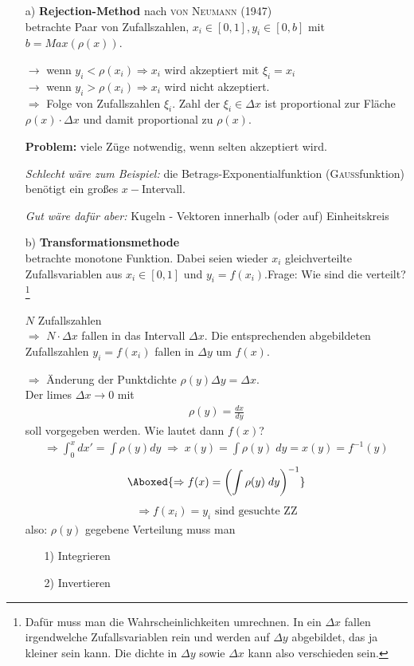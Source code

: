 \documentclass[12pt]{article}
\begin{document}
 \begin{itemize}
 \item[a)] \textbf{Rejection-Method} nach \textsc{von Neumann} (1947) \\
 betrachte Paar von Zufallszahlen, $x_i \in [0,1], y_i \in [0,b]$ mit $b=Max(\rho(x))$.
 
$\to$ wenn $y_i < \rho(x_i) \Rightarrow x_i$ wird akzeptiert mit $\xi_i=x_i$\\
 $\to$ wenn $y_i > \rho(x_i) \Rightarrow x_i$ wird nicht akzeptiert. \\
 
 $\Rightarrow$ Folge von Zufallszahlen $\xi_i$. Zahl der $\xi_i \in \Delta x$ ist proportional zur Fläche $\rho(x) \cdot \Delta x$ und damit proportional zu $\rho(x)$.
 
 \textbf{Problem:} viele Züge notwendig, wenn selten akzeptiert wird. 
 
 \textit{Schlecht wäre zum Beispiel:} die Betrags-Exponentialfunktion (\textsc{Gauß}funktion) benötigt ein großes $x-$Intervall.
 
\textit{Gut wäre dafür aber:} Kugeln - 
Vektoren innerhalb (oder auf) Einheitskreis

\item[b)] \textbf{Transformationsmethode} \\
betrachte monotone Funktion. Dabei seien wieder $x_i$ gleichverteilte Zufallsvariablen aus $x_i \in [0,1]$ und $y_i = f(x_i)$.Frage: Wie sind die verteilt? \footnote{Dafür muss man die Wahrscheinlichkeiten umrechnen. In ein $\Delta x$ fallen irgendwelche Zufallsvariablen rein und werden auf $\Delta y$ abgebildet, das ja kleiner sein kann. Die dichte in $\Delta y$ sowie $\Delta x$ kann also verschieden sein.} %

$N$ Zufallszahlen \\
 $\Rightarrow$ $N \cdot \Delta x$ fallen in das Intervall $\Delta x$. Die entsprechenden abgebildeten Zufallszahlen $y_i=f(x_i)$ fallen in $\Delta y$ um $f(x)$.

$\Rightarrow$ Änderung der Punktdichte $\rho(y)\Delta y = \Delta x$. \\
Der limes $\Delta x \to 0$ mit 
\begin{align*}
\rho(y)=\frac{dx}{dy}
\end{align*}
soll vorgegeben werden. Wie lautet dann $f(x)$?
\begin{align}
\Rightarrow  \int_0^x dx' = \int \rho(y) dy \; \Rightarrow \; x(y) = \int \rho(y) \; dy = x(y) = f^{-1}(y) 
\end{align}
\begin{align}
\Aboxed{\Rightarrow  f(x)= \left( \int \rho(y) \; dy \right)^{-1} }
\end{align}
\begin{align*}
\Rightarrow  f(x_i)=y_i \mbox{ sind gesuchte ZZ}
\end{align*} 
also: $\rho(y)$ gegebene Verteilung muss man 
\begin{enumerate}
\item[1)] Integrieren
\item[2)] Invertieren
\end{enumerate}


\end{itemize}
\end{document}

